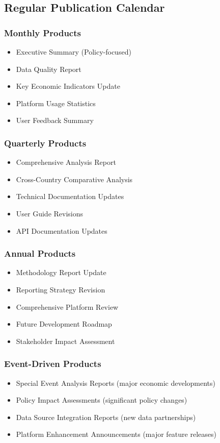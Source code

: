 \documentclass[11pt,a4paper]{article}
\begin{document}
\subsection{Regular Publication Calendar}

\subsubsection{Monthly Products}
\begin{itemize}
    \item Executive Summary (Policy-focused)
    \item Data Quality Report
    \item Key Economic Indicators Update
    \item Platform Usage Statistics
    \item User Feedback Summary
\end{itemize}

\subsubsection{Quarterly Products}
\begin{itemize}
    \item Comprehensive Analysis Report
    \item Cross-Country Comparative Analysis
    \item Technical Documentation Updates
    \item User Guide Revisions
    \item API Documentation Updates
\end{itemize}

\subsubsection{Annual Products}
\begin{itemize}
    \item Methodology Report Update
    \item Reporting Strategy Revision
    \item Comprehensive Platform Review
    \item Future Development Roadmap
    \item Stakeholder Impact Assessment
\end{itemize}

\subsubsection{Event-Driven Products}
\begin{itemize}
    \item Special Event Analysis Reports (major economic developments)
    \item Policy Impact Assessments (significant policy changes)
    \item Data Source Integration Reports (new data partnerships)
    \item Platform Enhancement Announcements (major feature releases)
\end{itemize}
\end{document}
